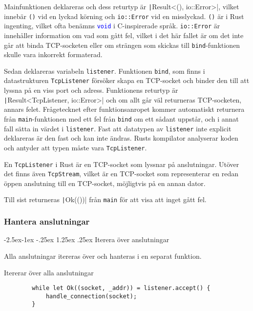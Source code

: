 \documentclass{article}
\makeatletter
\renewcommand\paragraph{\@startsection{paragraph}{4}{\z@}%
			{-2.5ex\@plus -1ex \@minus -.25ex}%
			{1.25ex \@plus .25ex}%
			{\normalfont\normalsize\bfseries}}
\makeatother
\begin{document}
Mainfunktionen deklareras och dess returtyp är
\texttt|Result<(), io::Error>|, vilket innebär \texttt{()} vid en
lyckad körning och \texttt{io::Error} vid en misslyckad. \texttt{()} är i Rust
ingenting, vilket ofta benämns \textcolor{blue}{\texttt{void}} i C-inspirerade
språk. \texttt{io::Error} är innehåller information om vad som gått fel, vilket
i det här fallet är om det inte går att binda TCP-socketen eller om strängen som
skickas till \texttt{bind}-funktionen skulle vara inkorrekt formaterad.

Sedan deklareras variabeln \texttt{listener}. Funktionen \texttt{bind}, som
finns i datastrukturen \texttt{TcpListener} försöker skapa en TCP-socket och
binder den till att lyssna på en viss port och adress. Funktionens returtyp är
\\ \texttt|Result<TcpListener, io::Error>| och om allt går väl returneras
TCP-socketen, annars felet. Frågetecknet efter funktionsanropet kommer
automatiskt returnera från \texttt{main}-funktionen med ett fel från
\texttt{bind} om ett sådant uppstår, och i annat fall sätta in värdet i
\texttt{listener}. Fast att datatypen av \texttt{listener} inte explicit
deklareras är den fast och kan inte ändras. Rusts kompilator analyserar koden
och antyder att typen måste vara \texttt{TcpListener}.

En \texttt{TcpListener} i Rust är en TCP-socket som lyssnar på anslutningar.
Utöver det finns även \texttt{TcpStream}, vilket är en TCP-socket som
representerar en redan öppen anslutning till en TCP-socket, möjligtvis på en
annan dator.

Till sist returneras \texttt|Ok(())| från \texttt{main} för att visa
att inget gått fel.

\subsubsection{Hantera anslutningar}

\paragraph{Iterera över anslutningar}

Alla anslutningar itereras över och hanteras i en separat funktion.

\begin{listing}[H]
	\caption{Itererar över alla anslutningar}
	\begin{verbatim}
		while let Ok((socket, _addr)) = listener.accept() {
			handle_connection(socket);
		}
	\end{verbatim}
\end{listing}
\end{document}
